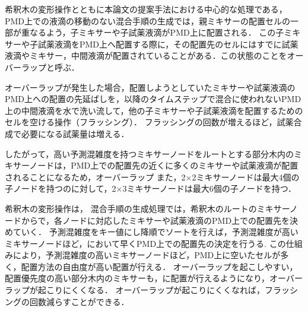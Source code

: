 希釈木の変形操作とともに本論文の提案手法における中心的な処理である，PMD上での液滴の移動のない混合手順の生成では，親ミキサーの配置セルの一部が重なるよう，子ミキサーや子試薬液滴がPMD上に配置される．
この子ミキサーや子試薬液滴をPMD上へ配置する際に，その配置先のセルにはすでに試薬液滴やミキサー，中間液滴が配置されていることがある．この状態のことをオーバーラップと呼ぶ．

オーバーラップが発生した場合，配置しようとしていたミキサーや試薬液滴のPMD上への配置の先延ばしを，以降のタイムステップで混合に使われないPMD上の中間液滴を水で洗い流して，他の子ミキサーや子試薬液滴を配置するためのセルを空ける操作（フラッシング）．
フラッシングの回数が増えるほど，試薬合成で必要になる試薬量は増える．

したがって，高い予測混雑度を持つミキサーノードをルートとする部分木内のミキサーノードは，PMD上での配置先の近くに多くのミキサーや試薬液滴が配置されることになるため，オーバーラップ
また，2$\times$2ミキサーノードは最大4個の子ノードを持つのに対して，2$\times$3ミキサーノードは最大6個の子ノードを持つ．

希釈木の変形操作は，
混合手順の生成処理では，希釈木のルートのミキサーノードからで，各ノードに対応したミキサーや試薬液滴のPMD上での配置先を決めていく．
予測混雑度をキー値にし降順でソートを行えば，予測混雑度が高いミキサーノードほど，において早くPMD上での配置先の決定を行うる.
この仕組みにより，予測混雑度の高いミキサーノードほど，PMD上に空いたセルが多く，配置方法の自由度が高い配置が行える．
オーバーラップを起こしやすい，配置優先度の高い部分木内のミキサーも，に配置が行えるようになり，オーバーラップが起こりにくくなる．
オーバーラップが起こりにくくなれば，フラッシングの回数減らすことができる．





